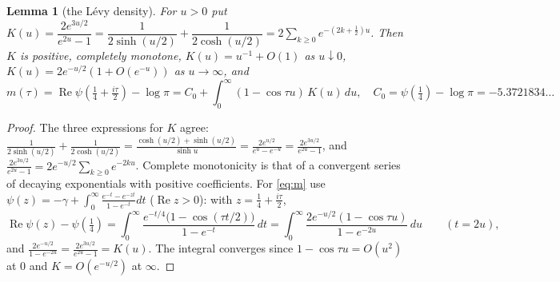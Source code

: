\documentclass[11pt]{amsart}
\newtheorem{lemma}[theorem]{Lemma}
\theoremstyle{definition}
\theoremstyle{remark}
\newcommand{\Rel}{\operatorname{Re}}
\begin{document}
\begin{lemma}[the L\'evy density]\label{lem:K}
For $u>0$ put $K(u)=\dfrac{2e^{3u/2}}{e^{2u}-1}=\dfrac{1}{2\sinh(u/2)}+\dfrac{1}{2\cosh(u/2)}
=2\sum_{k\ge0}e^{-(2k+\frac12)u}$. Then $K$ is positive, completely monotone,
$K(u)=u^{-1}+O(1)$ as $u\downarrow0$, $K(u)=2e^{-u/2}(1+O(e^{-u}))$ as $u\to\infty$, and
\begin{equation}\label{eq:m}
m(\tau)=\Rel\psi\!\left(\tfrac14+\tfrac{i\tau}2\right)-\log\pi
= C_0+\int_0^\infty(1-\cos\tau u)\,K(u)\,du,\quad C_0=\psi(\tfrac14)-\log\pi=-5.3721834\ldots
\end{equation}
\end{lemma}
\begin{proof}
The three expressions for $K$ agree: $\frac{1}{2\sinh(u/2)}+\frac1{2\cosh(u/2)}
=\frac{\cosh(u/2)+\sinh(u/2)}{\sinh u}=\frac{2e^{u/2}}{e^u-e^{-u}}=\frac{2e^{3u/2}}{e^{2u}-1}$, and
$\frac{2e^{3u/2}}{e^{2u}-1}=2e^{-u/2}\sum_{k\ge0}e^{-2ku}$. Complete monotonicity is that of a
convergent series of decaying exponentials with positive coefficients. For \eqref{eq:m} use
$\psi(z)=-\gamma+\int_0^\infty\frac{e^{-t}-e^{-zt}}{1-e^{-t}}dt$ ($\Rel z>0$): with $z=\frac14+\frac{i\tau}2$,
\[
\Rel\psi(z)-\psi(\tfrac14)=\int_0^\infty\frac{e^{-t/4}\big(1-\cos(\tau t/2)\big)}{1-e^{-t}}\,dt
=\int_0^\infty\frac{2e^{-u/2}(1-\cos\tau u)}{1-e^{-2u}}\,du\qquad(t=2u),
\]
and $\frac{2e^{-u/2}}{1-e^{-2u}}=\frac{2e^{3u/2}}{e^{2u}-1}=K(u)$. The integral converges since
$1-\cos\tau u=O(u^2)$ at $0$ and $K=O(e^{-u/2})$ at $\infty$.
\end{proof}
\end{document}
